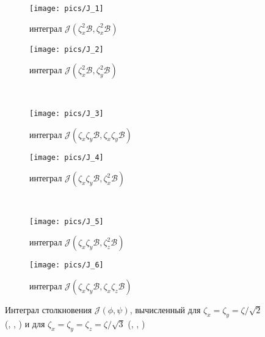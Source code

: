 \documentclass[a4paper,12pt]{article}
\begin{document}
\begin{figure}
    \centering
    \begin{subfigure}[b]{.5\linewidth}
        \centering
        \texttt{[image: pics/J\_1]}
    	\caption{интеграл \(\mathcal{J}\left( \zeta_x^2\mathcal{B}, \zeta_x^2\mathcal{B} \right)\)}\label{fig:J_1}
    \end{subfigure}%
    \begin{subfigure}[b]{.5\linewidth}
        \centering
        \texttt{[image: pics/J\_2]}
    	\caption{интеграл \(\mathcal{J}\left( \zeta_x^2\mathcal{B}, \zeta_y^2\mathcal{B} \right)\)}\label{fig:J_2}
    \end{subfigure}\\[6pt]
    \begin{subfigure}[b]{.5\linewidth}
        \centering
        \texttt{[image: pics/J\_3]}
    	\caption{интеграл \(\mathcal{J}\left( \zeta_x\zeta_y\mathcal{B}, \zeta_x\zeta_y\mathcal{B} \right)\)}\label{fig:J_3}
    \end{subfigure}%
    \begin{subfigure}[b]{.5\linewidth}
        \centering
        \texttt{[image: pics/J\_4]}
    	\caption{интеграл \(\mathcal{J}\left( \zeta_x\zeta_y\mathcal{B}, \zeta_x^2\mathcal{B} \right)\)}\label{fig:J_4}
    \end{subfigure}\\[6pt]
    \begin{subfigure}[b]{.5\linewidth}
        \centering
        \texttt{[image: pics/J\_5]}
    	\caption{интеграл \(\mathcal{J}\left( \zeta_x\zeta_y\mathcal{B}, \zeta_z^2\mathcal{B} \right)\)}\label{fig:J_5}
    \end{subfigure}%
    \begin{subfigure}[b]{.5\linewidth}
        \centering
        \texttt{[image: pics/J\_6]}
    	\caption{интеграл \(\mathcal{J}\left( \zeta_x\zeta_y\mathcal{B}, \zeta_x\zeta_z\mathcal{B} \right)\)}\label{fig:J_6}
    \end{subfigure}
    \caption{Интеграл столкновения \(\mathcal{J}(\phi,\psi)\),
        вычисленный для \(\zeta_x=\zeta_y=\zeta/\sqrt2\) (, , )
        и для \(\zeta_x=\zeta_y=\zeta_z=\zeta/\sqrt3\) (, , ) }
    \label{fig:J_allQ}
\end{figure}
\end{document}

